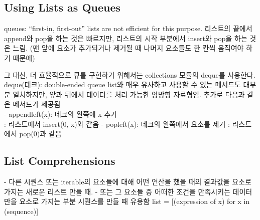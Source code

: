 \subsection{Using Lists as Queues}
queues: “first-in, first-out”
lists are not efficient for this purpose. 리스트의 끝에서 append와 pop을 하는 것은 빠르지만, 리스트의 시작 부분에서 insert와 pop을 하는 것은 느림. (맨 앞에 요소가 추가되거나 제거될 때 나머지 요소들도 한 칸씩 움직여야 하기 때문에)

그 대신, 더 효율적으로 큐를 구현하기 위해서는 collections 모듈의 deque를 사용한다.
deque(데크): double-ended queue
list와 매우 유사하고 사용할 수 있는 메서드도 대부분 일치하지만, 앞과 뒤에서 데이터를 처리 가능한 양방향 자료형임. 추가로 다음과 같은 메서드가 제공됨\\
- appendleft(x): 데크의 왼쪽에 x 추가\\
  : 리스트에서 insert(0, x)와 같음
- popleft(x): 데크의 왼쪽에서 요소를 제거
  : 리스트에서 pop(0)과 같음

\subsection{List Comprehensions}
- 다른 시퀀스 또는 iterable의 요소들에 대해 어떤 연산을 했을 때의 결과값을 요소로 가지는 새로운 리스트 만들 때.
- 또는 그 요소들 중 어떠한 조건을 만족시키는 데이터만을 요소로 가지는 부분 시퀀스를 만들 때 유용함
list = [(expression of x) for x in (sequence)]

